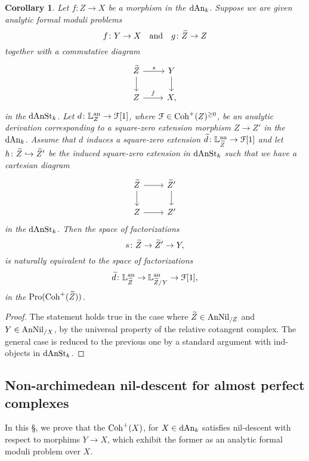 \documentclass[10pt,a4paper,reqno]{amsart} %
\theoremstyle{plain}
\newtheorem{cor}[thm]{Corollary}
\theoremstyle{definition}
\theoremstyle{remark}
\numberwithin{equation}{section}
\begin{document}
\begin{cor} \label{cor:universal_property_of_relative_cotangent_complex_for_morphisms_between_analytic_FMP}
    Let $f \colon Z \to X$ be a morphism in the \infcat $\mathrm{dAn}_k$. Suppose we are given analytic formal moduli problems
        \[
            f \colon Y \to X \quad \mathrm{and} \quad g \colon \widetilde Z \to Z
        \]
    together with a commutative diagram
        \[
        \begin{tikzcd}
            \tZ \ar{r}{s} \ar{d} & Y \ar{d} \\
            Z \ar{r}{f} & X,  
        \end{tikzcd}
        \]
    in the \infcat $\mathrm{dAnSt}_k$. Let $d \colon \mathbb L^\mathrm{an}_Z \to \mathcal F[1]$, where $\mathcal F \in \mathrm{Coh}^+(Z)^{\ge 0}$, be an analytic derivation corresponding to a square-zero extension morphism
    $Z \to Z'$ in the \infcat $\mathrm{dAn}_k$. Assume that $d$ induces a square-zero extension
    $\widetilde{d} \colon \mathbb L^\mathrm{an}_{\widetilde Z} \to \mathcal F[1]$
    and let $h \colon \widetilde Z \hookrightarrow \widetilde Z'$ be the induced square-zero extension in $\mathrm{dAnSt}_k$ such that we have a cartesian diagram
        \[
        \begin{tikzcd}
            \tZ \ar{r} \ar{d} & \tZ' \ar{d} \\
            Z \ar{r} & Z'  
        \end{tikzcd}
        \]
    in the \infcat $\mathrm{dAnSt}_k$. Then the space of factorizations
        \[
            s \colon \widetilde Z \to \widetilde Z' \to Y,  
        \]
    is naturally equivalent to the space of factorizations
        \[
            \widetilde{d} \colon \mathbb L^\mathrm{an}_{\widetilde Z} \to  \mathbb L^\mathrm{an}_{\widetilde Z/ Y} \to \mathcal F[1]  ,
        \]
    in the \infcat $\mathrm{Pro}(\mathrm{Coh}^+(\widetilde Z))$.
\end{cor}

\begin{proof}
    The statement holds true in the case where $\widetilde Z \in \mathrm{AnNil}_{/Z}$ and $Y \in \mathrm{AnNil}_{/X}$, by the universal property of the relative cotangent complex.
    The general case is reduced to the previous one by a standard argument with ind-objects in $\mathrm{dAnSt}_k$.
\end{proof}


\subsection{Non-archimedean nil-descent for almost perfect complexes}
In this \S, we prove that the \infcat $\mathrm{Coh}^+(X)$, for $X \in \mathrm{dAn}_k$ satisfies nil-descent with respect to morphims $Y \to X$, which exhibit
the former as an analytic formal moduli problem over $X$.
\end{document}
